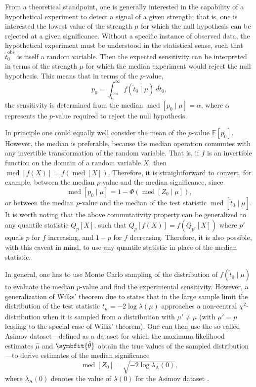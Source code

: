 \documentclass[b5paper, 10pt, twoside]{book}
\newcommand{\unitv}[1]{\symbfit{\hat{#1}}}
\newcommand{\difd}{\,d}
\DeclareMathOperator{\med}{med}
\begin{document}
From a theoretical standpoint, one is generally interested in the capability of a hypothetical experiment to detect a signal of a given strength; that is, one is interested the lowest value of the strength $\mu$ for which the null hypothesis can be rejected at a given significance. Without a specific instance of observed data, the hypothetical experiment must be understood in the statistical sense, such that $\tilde{t}_0^\text{obs}$ is itself a random variable. Then the expected sensitivity can be interpreted in terms of the strength $\mu$ for which the median experiment would reject the null hypothesis. This means that in terms of the $p$-value,
\begin{equation}
    p_0=\int_{\tilde{t}_0^\text{obs}}^\infty f(\tilde{t}_0\mid\mu)\difd\tilde{t}_0,
\end{equation}
the sensitivity is determined from the median $\med[p_0\mid\mu]=\alpha$, where $\alpha$ represents the $p$-value required to reject the null hypothesis.

In principle one could equally well consider the mean of the $p$-value $\mathbb{E}[p_0]$. However, the median is preferable, because the median operation commutes with any invertible transformation of the random variable. That is, if $f$ is an invertible function on the domain of a random variable $X$, then $\med[f(X)]=f(\med[X])$. Therefore, it is straightforward to convert, for example, between the median $p$-value and the median significance, since
\begin{equation}
    \med[p_0\mid\mu]=1-\Phi(\med[Z_0\mid\mu]),
\end{equation}
or between the median $p$-value and the median of the test statistic $\med[\tilde{t}_0\mid\mu]$. It is worth noting that the above commutativity property can be generalized to any quantile statistic $Q_p[X]$, such that $Q_p[f(X)]=f(Q_{p'}[X])$ where $p'$ equals $p$ for $f$ increasing, and $1-p$ for $f$ decreasing. Therefore, it is also possible, with this caveat in mind, to use any quantile statistic in place of the median statistic.

In general, one has to use Monte Carlo sampling of the distribution of $f(\tilde{t}_0\mid\mu)$ to evaluate the median $p$-value and find the experimental sensitivity. However, a generalization of Wilks' theorem due to \textcite{Wald1943} states that in the large sample limit the distribution of the test statistic $t_\mu=-2\log\lambda(\mu)$ approaches a non-central $\chi^2$-distribution when it is sampled from a distribution with $\mu'\neq\mu$ (with $\mu'=\mu$ leading to the special case of Wilks' theorem). One can then use the so-called Asimov dataset---defined as a dataset for which the maximum likelihood estimates $\hat{\mu}$ and $\unitv{\theta}$ obtain the true values of the sampled distribution---to derive estimates of the median significance
\begin{equation}
\med[Z_0]=\sqrt{-2\log\lambda_\text{A}(0)},
\end{equation}where $\lambda_\text{A}(0)$ denotes the value of $\lambda(0)$ for the Asimov dataset \parencite{CowanEtAl2011}.
\end{document}

